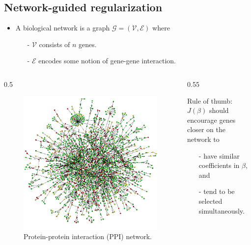 \documentclass[xcolor=x11names,compress]{beamer}
\theoremstyle{plain}
\renewcommand{\(}{\begin{columns}}
\renewcommand{\)}{\end{columns}}
\newcommand{\<}[1]{\begin{column}{#1}}
\renewcommand{\>}{\end{column}}
\begin{document}
\subsection{Network-guided regularization}
\begin{frame}{\insertsubsection}
	
	\begin{itemize}
		\item A biological network is a graph $\mathcal{G} = (\mathcal{V}, \mathcal{E})$ where
		\begin{itemize}
			\item[-] $\mathcal{V}$ consists of $n$ genes.
			\item[-] $\mathcal{E}$ encodes some notion of gene-gene interaction.
		\end{itemize}
	\end{itemize}
	
	\vskip -0.1in
	
	\(
	\<{0.5\linewidth}
	\begin{figure}
	\begin{center}
		\includegraphics[width=0.9\columnwidth]{slides/ppi}
		\vskip -0.1in
		\caption{Protein-protein interaction (PPI) network.}
	\end{center}
	\end{figure}
	\>
	\hskip -0.3cm
	\<{0.55\linewidth}
	\begin{framed}
	\alert{Rule of thumb:}\\
	$J(\beta)$ should encourage genes closer on the network to
	\begin{itemize}
		\item[-] have similar coefficients in $\beta$, and
		\item[-] tend to be selected simultaneously.
	\end{itemize}
	\end{framed}
	\>
	\)
	
\end{frame}
\end{document}
